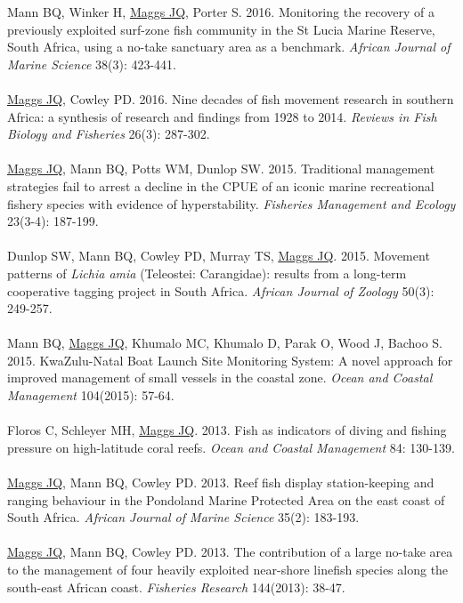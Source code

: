 \documentclass[10pt,a4paper]{article}
\begin{document}
Mann BQ, Winker H, \underline{Maggs JQ}, Porter S. 2016. Monitoring the recovery of a previously exploited surf-zone fish community in the St Lucia Marine Reserve, South Africa, using a no-take sanctuary area as a benchmark. \textit{African Journal of Marine Science} 38(3): 423-441.\\
\\
\underline{Maggs JQ}, Cowley PD. 2016. Nine decades of fish movement research in southern Africa: a synthesis of research and findings from 1928 to 2014. \textit{Reviews in Fish Biology and Fisheries} 26(3): 287-302.\\
\\
\underline{Maggs JQ}, Mann BQ, Potts WM, Dunlop SW. 2015. Traditional management strategies fail to arrest a decline in the CPUE of an iconic marine recreational fishery species with evidence of hyperstability. \textit{Fisheries Management and Ecology} 23(3-4): 187-199.\\
\\
Dunlop SW, Mann BQ, Cowley PD, Murray TS, \underline{Maggs JQ}. 2015. Movement patterns of \textit{Lichia amia} (Teleostei: Carangidae): results from a long-term cooperative tagging project in South Africa. \textit{African Journal of Zoology} 50(3): 249-257.\\
\\
Mann BQ, \underline{Maggs JQ}, Khumalo MC, Khumalo D, Parak O, Wood J, Bachoo S. 2015. KwaZulu-Natal Boat Launch Site Monitoring System: A novel approach for improved management of small vessels in the coastal zone. \textit{Ocean and Coastal Management} 104(2015): 57-64.\\
\\
Floros C, Schleyer MH, \underline{Maggs JQ}. 2013. Fish as indicators of diving and fishing pressure on high-latitude coral reefs. \textit{Ocean and Coastal Management} 84: 130-139.\\
\\ 
\underline{Maggs JQ}, Mann BQ, Cowley PD. 2013. Reef fish display station-keeping and ranging behaviour in the Pondoland Marine Protected Area on the east coast of South Africa. \textit{African Journal of Marine Science} 35(2): 183-193.\\
\\
\underline{Maggs JQ}, Mann BQ, Cowley PD. 2013. The contribution of a large no-take area to the management of four heavily exploited near-shore linefish species along the south-east African coast. \textit{Fisheries Research} 144(2013): 38-47.\\
\end{document}
